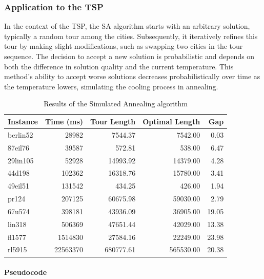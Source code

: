 \subsubsection{Application to the \Gls{TSP}}

In the context of the \Gls{TSP}, the SA algorithm starts with an arbitrary solution, typically a random tour among the cities. Subsequently, it iteratively refines this tour by making slight modifications, such as swapping two cities in the tour sequence. The decision to accept a new solution is probabilistic and depends on both the difference in solution quality and the current temperature. This method's ability to accept worse solutions decreases probabilistically over time as the temperature lowers, simulating the cooling process in annealing.


\begin{table}[H]
  \centering
	\caption{Results of the Simulated Annealing algorithm}
	\begin{tabular}{lrrrr}
		\toprule
		Instance  & Time (ms) & Tour Length & Optimal Length & Gap   \\
		\midrule
		berlin52 & 28982      & 7544.37        & 7542.00          & 0.03  \\
		87eil76  & 39587      & 572.81         & 538.00           & 6.47  \\
		29lin105 & 52928      & 14993.92       & 14379.00         & 4.28  \\
		44d198   & 102362     & 16318.76       & 15780.00         & 3.41  \\
		49eil51  & 131542     & 434.25         & 426.00           & 1.94  \\
		pr124    & 207125     & 60675.98       & 59030.00         & 2.79  \\
		67u574   & 398181     & 43936.09       & 36905.00         & 19.05 \\
		lin318   & 506369     & 47651.44       & 42029.00         & 13.38 \\
		fl1577   & 1514830    & 27584.16       & 22249.00         & 23.98 \\
		rl5915   & 22563370   & 680777.61      & 565530.00        & 20.38 \\
		\bottomrule
	\end{tabular}
\end{table}

\paragraph{Pseudocode}

